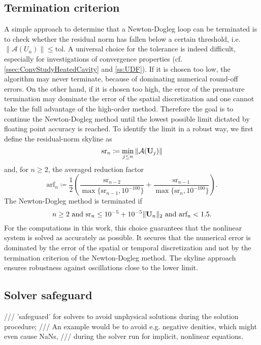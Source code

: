 \subsection{Termination criterion}
\label{ssec:TerminationCriterion}
A simple approach to determine that a Newton-Dogleg loop can be terminated 
is to check whether the residual norm has fallen below a certain threshold, i.e.
$ \| \mathcal{A}(U_n) \| \leq \textrm{tol}  $.
A universal choice for the tolerance is indeed difficult, 
especially for investigations of convergence properties (cf.  \cref{ssec:ConvStudyHeatedCavity} and \cref{ss:UDF}).
If it is chosen too low, the algorithm may never terminate, because of dominating numerical round-off errors. On the other hand, if it is chosen too high, the error of the premature termination may dominate  the error of 
the spatial discretization and one cannot take the full advantage of the high-order method.
Therefore the goal is to continue the Newton-Dogleg method until 
the lowest possible limit dictated by floating point accuracy is reached.
To identify the limit in a robust way, we first define the residual-norm skyline as
\begin{equation}
\textrm{sr}_n \coloneqq \min_{j \leq n} \| \mathcal{A}(\textbf{U}_j) \| 
\end{equation}
and, for $n \geq 2$, the averaged reduction factor
\begin{equation}
\textrm{arf}_n \coloneqq \frac{1}{2} \left(
\frac{ \textrm{sr}_{n-2} }{  \max \{ \textrm{sr}_{n-1}, 10^{-100} \} }
+  \frac{ \textrm{sr}_{n-1} }{  \max \{ \textrm{sr}_{n},   10^{-100} \} }
\right) .
\end{equation}
The Newton-Dogleg method is terminated if
\begin{equation}
n \geq 2 \text{ and }
\textrm{sr}_n \leq 10^{-5} + 10^{-5} \| \textbf{U}_n \|_2 \text{ and }
\textrm{arf}_n < 1.5 .
\end{equation}
For the computations in this work, this choice guarantees that the 
nonlinear system is solved as accurately as possible. It secures that the numerical error is dominated by the error of the spatial or temporal discretization
and not by the termination criterion of the Newton-Dogleg method.
The skyline approach ensures robustness against oscillations close to the lower limit.
\subsection{Solver safeguard}
        /// 'safeguard' for solvers to avoid unphysical solutions during the solution procedure;
/// An example would be to avoid e.g. negative denities, which might even cause NaNs,
/// during the solver run for implicit, nonlinear equations.
